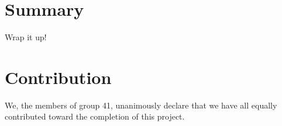 \section{Summary}
Wrap it up!
\section{Contribution}
We, the members of group 41, unanimously declare that we have all equally contributed toward the completion of this project.
